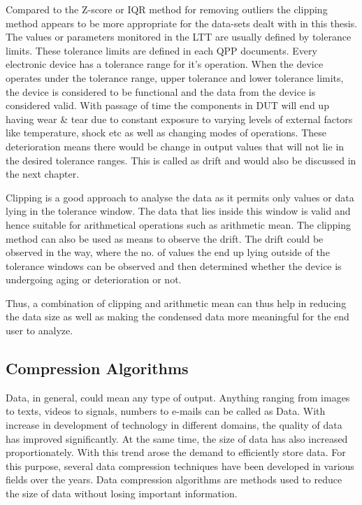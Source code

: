 Compared to the Z-score or IQR method for removing outliers the clipping method appears to be more appropriate for the data-sets dealt with in this thesis. The values or parameters monitored in the LTT are usually defined by tolerance limits. These tolerance limits are defined in each QPP documents. Every electronic device has a tolerance range for it's operation. When the device operates under the tolerance range, upper tolerance and lower tolerance limits, the device is considered to be functional and the data from the device is considered valid. With passage of time the components in DUT will end up having wear \& tear due to constant exposure to varying levels of external factors like temperature, shock etc as well as changing modes of operations. These deterioration means there would be change in output values that will not lie in the desired tolerance ranges. This is called as drift and would also be discussed in the next chapter. 

Clipping is a good approach to analyse the data as it permits only values or data lying in the tolerance window. The data that lies inside this window is valid and hence suitable for arithmetical operations such as arithmetic mean. The clipping method can also be used as means to observe the drift. The drift could be observed in the way, where the no. of values the end up lying outside of the tolerance windows can be observed and then determined whether the device is undergoing aging or deterioration or not. 

Thus, a combination of clipping and arithmetic mean can thus help in reducing the data size as well as making the condensed data more meaningful for the end user to analyze. 
\newpage

\subsection{Compression Algorithms}

Data, in general, could mean any type of output. Anything ranging from images to texts, videos to signals, numbers to e-mails can be called as Data. With increase in development of technology in different domains, the quality of data has improved significantly. At the same time, the size of data has also increased proportionately. With this trend arose the demand to efficiently store data. For this purpose, several data compression techniques have been developed in various fields over the years. Data compression algorithms are methods used to reduce the size of data without losing important information. 

